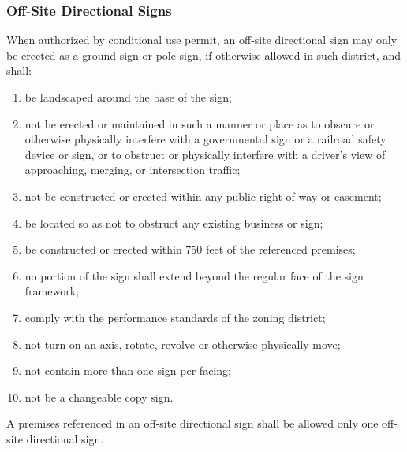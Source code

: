 \subsubsection{Off-Site Directional Signs}
When authorized by conditional use permit, an off-site directional sign may only be erected as a ground sign or pole sign, if otherwise allowed in such district, and shall:
\begin{enumerate}[{\indent}a)]
    \item be landscaped around the base of the sign; 
    \item not be erected or maintained in such a manner or place as to obscure or otherwise physically interfere with a governmental sign or a railroad safety device or sign, or to obstruct or physically interfere with a driver’s view of approaching, merging, or intersection traffic; 
    \item not be constructed or erected within any public right-of-way or easement; 
    \item be located so as not to obstruct any existing business or sign;
    \item be constructed or erected within 750 feet of the referenced premises; 
    \item no portion of the sign shall extend beyond the regular face of the sign framework; 
    \item comply with the performance standards of the zoning district; 
    \item not turn on an axis, rotate, revolve or otherwise physically move;
    \item not contain more than one sign per facing;
    \item not be a changeable copy sign.
\end{enumerate}
A premises referenced in an off-site directional sign shall be allowed only one off-site directional sign.
